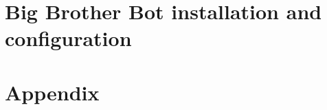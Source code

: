 \documentclass[11pt,twoside,a4paper]{article}
\begin{document}
\section{Big Brother Bot installation and configuration}
\label{sec:b3}



\clearpage
\appendix

\section{Appendix}
\label{sec:anx}




\end{document}
